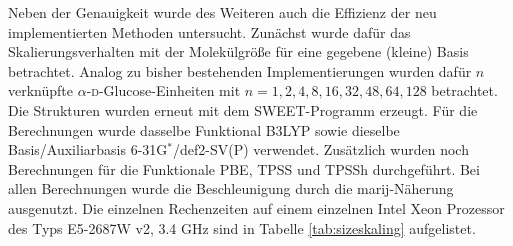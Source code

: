 \bigskip
Neben der Genauigkeit wurde des Weiteren auch die Effizienz der neu implementierten Methoden untersucht. Zunächst wurde dafür das Skalierungsverhalten mit der Molekülgröße für eine gegebene (kleine) Basis betrachtet. Analog zu bisher bestehenden Implementierungen\supercite{beer2011nuclei,kumar2016nuclei} wurden dafür $n$ verknüpfte $\alpha$-\textsc{d}-Glucose-Einheiten mit $n=1,2,4,8,16,32,48,64,128$ betrachtet. Die Strukturen wurden erneut mit dem SWEET-Programm erzeugt. Für die Berechnungen wurde dasselbe Funktional B3LYP\supercite{becke1993density,lee1988development,stephens1994ab} sowie dieselbe Basis/Auxiliarbasis 6-31G$^*$\supercite{hariharan1973influence}/def2-SV(P)\supercite{eichkorn1995auxiliary} verwendet. Zusätzlich wurden noch Berechnungen für die Funktionale PBE, TPSS und TPSSh durchgeführt. Bei allen Berechnungen wurde die Beschleunigung durch die \ac{marij}-Näherung ausgenutzt. Die einzelnen Rechenzeiten auf einem einzelnen Intel\textsuperscript{\textregistered} Xeon\textsuperscript{\textregistered} Prozessor des Typs E5-2687W v2, 3.4 GHz sind in Tabelle \ref{tab:sizeskaling} aufgelistet. 


